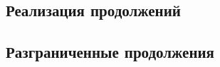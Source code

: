 

\subsection{Реализация продолжений}


\subsection{Разграниченные продолжения}









\cite{reynolds1993discoveries}
\cite{reynolds1972definitional}
\cite{dyvbig2007monadic}

















